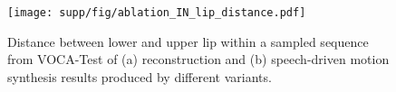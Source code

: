 \begin{figure}[!t]
    \centering
    \texttt{[image: supp/fig/ablation\_IN\_lip\_distance.pdf]}
    \caption{Distance between lower and upper lip within a sampled sequence from VOCA-Test of (a) reconstruction and (b) speech-driven motion synthesis results produced by different variants.}
    \label{fig:ablation_IN}
\end{figure}

\begin{table}
\centering
\caption{
  Ablation study on the Instance Normalization (IN) for self-reconstruction learning. The performance is measured by the reconstruction error on VOCA-Test and BIWI-Test-A.
}\vspace{-0.5em}
  \label{tab:ablation_IN}
\end{table}

